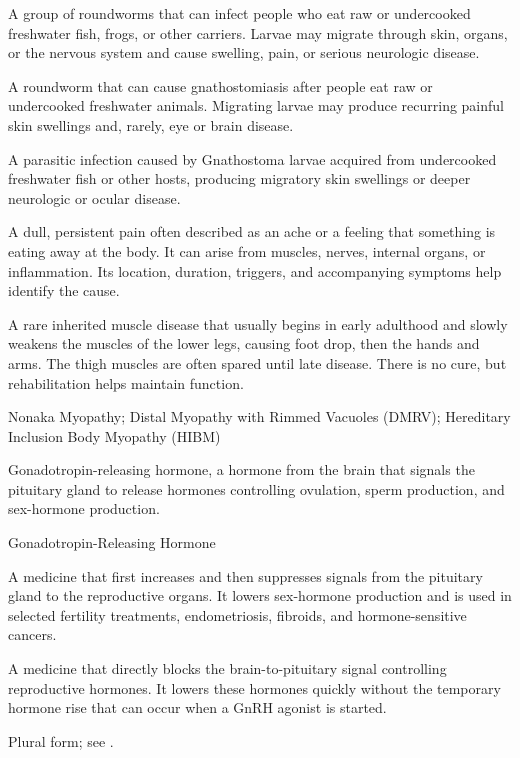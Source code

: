  A group of roundworms that can infect people who eat raw or undercooked freshwater fish, frogs, or other carriers. Larvae may migrate through skin, organs, or the nervous system and cause swelling, pain, or serious neurologic disease.

 A roundworm that can cause gnathostomiasis after people eat raw or undercooked freshwater animals. Migrating larvae may produce recurring painful skin swellings and, rarely, eye or brain disease.

 A parasitic infection caused by Gnathostoma larvae acquired from undercooked freshwater fish or other hosts, producing migratory skin swellings or deeper neurologic or ocular disease.

 A dull, persistent pain often described as an ache or a feeling that something is eating away at the body. It can arise from muscles, nerves, internal organs, or inflammation. Its location, duration, triggers, and accompanying symptoms help identify the cause.

 A rare inherited muscle disease that usually begins in early adulthood and slowly weakens the muscles of the lower legs, causing foot drop, then the hands and arms. The thigh muscles are often spared until late disease. There is no cure, but rehabilitation helps maintain function.

\synonyms
Nonaka Myopathy; Distal Myopathy with Rimmed Vacuoles (DMRV); Hereditary Inclusion Body Myopathy (HIBM)

 Gonadotropin-releasing hormone, a hormone from the brain that signals the pituitary gland to release hormones controlling ovulation, sperm production, and sex-hormone production.

\synonyms
Gonadotropin-Releasing Hormone

 A medicine that first increases and then suppresses signals from the pituitary gland to the reproductive organs. It lowers sex-hormone production and is used in selected fertility treatments, endometriosis, fibroids, and hormone-sensitive cancers.

 A medicine that directly blocks the brain-to-pituitary signal controlling reproductive hormones. It lowers these hormones quickly without the temporary hormone rise that can occur when a GnRH agonist is started.

 Plural form; see .

